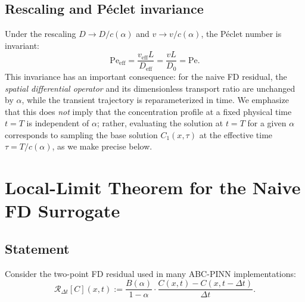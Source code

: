 \documentclass[11pt]{article}
\begin{document}
\subsection{Rescaling and P\'eclet invariance}
\label{sec:peclet}

Under the rescaling \(D \to D/c(\alpha)\) and \(v \to v/c(\alpha)\), the P\'eclet number is invariant:
\begin{equation}
\mathrm{Pe}_{\mathrm{eff}} = \frac{v_{\mathrm{eff}} L}{D_{\mathrm{eff}}} = \frac{vL}{D_0} = \mathrm{Pe}.
\end{equation}
This invariance has an important consequence: for the naive FD residual, the \emph{spatial differential operator} and its dimensionless transport ratio are unchanged by \(\alpha\), while the transient trajectory is reparameterized in time. We emphasize that this does \emph{not} imply that the concentration profile at a fixed physical time \(t=T\) is independent of \(\alpha\); rather, evaluating the solution at \(t=T\) for a given \(\alpha\) corresponds to sampling the base solution \(C_1(x,\tau)\) at the effective time \(\tau = T/c(\alpha)\), as we make precise below.

\section{Local-Limit Theorem for the Naive FD Surrogate}
\label{sec:local_limit}

\subsection{Statement}

Consider the two-point FD residual used in many ABC-PINN implementations:
\begin{equation}
\mathcal{R}_{\Delta t}[C](x,t) := \frac{B(\alpha)}{1-\alpha}\cdot\frac{C(x,t)-C(x,t-\Delta t)}{\Delta t}.
\label{eq:residual}
\end{equation}
\end{document}
